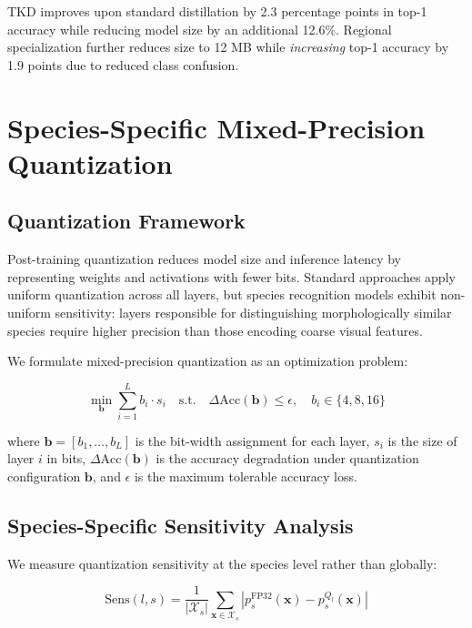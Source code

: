 \documentclass[11pt,a4paper]{article}
\begin{document}
TKD improves upon standard distillation by 2.3 percentage points in top-1 accuracy while reducing model size by an additional 12.6\%.
Regional specialization further reduces size to 12 MB while \emph{increasing} top-1 accuracy by 1.9 points due to reduced class confusion.

\section{Species-Specific Mixed-Precision Quantization}
\label{sec:quantization}

\subsection{Quantization Framework}

Post-training quantization reduces model size and inference latency by representing weights and activations with fewer bits.
Standard approaches apply uniform quantization across all layers, but species recognition models exhibit non-uniform sensitivity: layers responsible for distinguishing morphologically similar species require higher precision than those encoding coarse visual features.

We formulate mixed-precision quantization as an optimization problem:

\begin{equation}
    \min_{\mathbf{b}} \sum_{i=1}^{L} b_i \cdot s_i \quad \text{s.t.} \quad \Delta\text{Acc}(\mathbf{b}) \leq \epsilon, \quad b_i \in \{4, 8, 16\}
\end{equation}

\noindent where $\mathbf{b} = [b_1, \ldots, b_L]$ is the bit-width assignment for each layer, $s_i$ is the size of layer $i$ in bits, $\Delta\text{Acc}(\mathbf{b})$ is the accuracy degradation under quantization configuration $\mathbf{b}$, and $\epsilon$ is the maximum tolerable accuracy loss.

\subsection{Species-Specific Sensitivity Analysis}

We measure quantization sensitivity at the species level rather than globally:

\begin{equation}
    \text{Sens}(l, s) = \frac{1}{|\mathcal{X}_s|} \sum_{\mathbf{x} \in \mathcal{X}_s} |p_s^{\text{FP32}}(\mathbf{x}) - p_s^{Q_l}(\mathbf{x})|
\end{equation}
\end{document}
